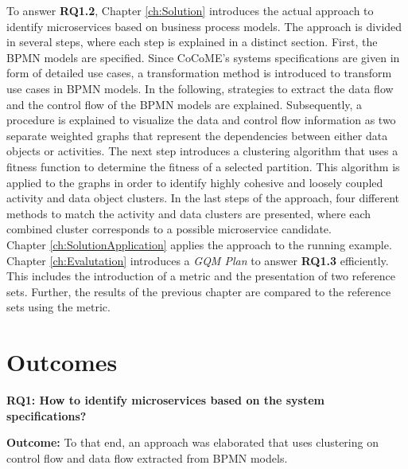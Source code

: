 To answer \textbf{RQ1.2}, Chapter \ref{ch:Solution} introduces the actual approach to identify microservices based on business process models.  The approach is divided in several steps, where each step is explained in a distinct section. First, the BPMN models are specified. Since CoCoME's systems specifications are given in form of detailed use cases, a transformation method is introduced to transform use cases in BPMN models. In the following, strategies to extract the data flow and the control flow of the BPMN models are explained. Subsequently, a procedure is explained to visualize the data and control flow information as two separate weighted graphs that represent the dependencies between either data objects or activities. The next step introduces a clustering algorithm that uses a fitness function to determine the fitness of a selected partition. This algorithm is applied to the graphs in order to identify highly cohesive and loosely coupled activity and data object clusters. In the last steps of the approach, four different methods to match the activity and data clusters are presented, where each combined cluster corresponds to a possible microservice candidate. \\
Chapter \ref{ch:SolutionApplication} applies the approach to the running example. Chapter \ref{ch:Evalutation} introduces a \textit{GQM Plan} to answer \textbf{RQ1.3} efficiently. This includes the introduction of a metric and the presentation of two reference sets. Further, the results of the previous chapter are compared to the reference sets using the metric.


\section{Outcomes}


\vspace{0.5cm}
\par
\begingroup

\noindent
\textbf{RQ1: How to identify microservices based on the system specifications? }

\vspace{0.3cm}
\noindent
\textbf{Outcome:} To that end, an approach was elaborated that uses clustering on control flow and data flow extracted from BPMN models.

\endgroup
\vspace{0.5cm}


\vspace{0.5cm}
\par
\begingroup

